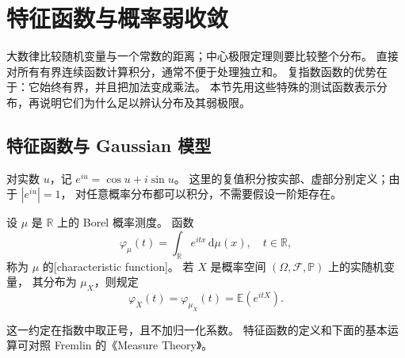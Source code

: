 \section{特征函数与概率弱收敛}
\label{b1:sec:3006}

大数律比较随机变量与一个常数的距离；中心极限定理则要比较整个分布。
直接对所有有界连续函数计算积分，通常不便于处理独立和。
复指数函数的优势在于：它始终有界，并且把加法变成乘法。
本节先用这些特殊的测试函数表示分布，再说明它们为什么足以辨认分布及其弱极限。

\subsection{特征函数与 Gaussian 模型}
\label{b1:subsec:300601}

对实数 \(u\)，记 \(e^{iu}=\cos u+i\sin u\)。
这里的复值积分按实部、虚部分别定义；由于 \(|e^{iu}|=1\)，
对任意概率分布都可以积分，不需要假设一阶矩存在。

\begin{definition}\label{b1:def:30-characteristic-function}
设 \(\mu\) 是 \(\mathbb R\) 上的 Borel 概率测度。
函数
\[
 \varphi_\mu(t)=\int_{\mathbb R}e^{itx}\,\mathrm d\mu(x),
 \quad t\in\mathbb R,
\]
称为 \(\mu\) 的[characteristic function]。
若 \(X\) 是概率空间 \((\Omega,\mathcal F,\mathbb P)\) 上的实随机变量，
其分布为 \(\mu_X\)，则规定
\[
 \varphi_X(t)=\varphi_{\mu_X}(t)=\mathbb E(e^{itX}).
\]
\end{definition}

这一约定在指数中取正号，且不加归一化系数。
特征函数的定义和下面的基本运算可对照
Fremlin 的《Measure Theory》\cite[285A, 285F, 285I]{Fremlin2016Measure}。

